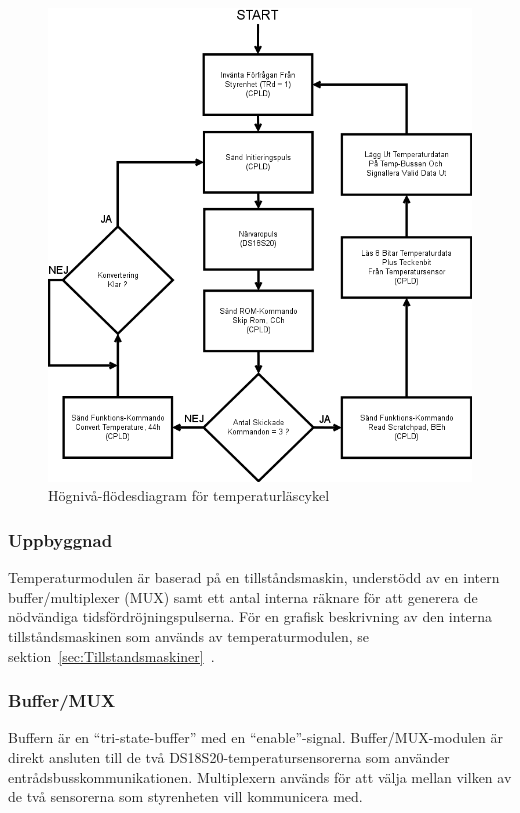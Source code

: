 \documentclass[a4paper,11pt]{article}
\begin{document}
		\begin{figure}[H]
		  \centering
		      \includegraphics[scale=0.5, angle=0]{ReadCycleFlowChart.png}
		  	\caption{Högnivå-flödesdiagram för temperaturläscykel}
			\label{fig:RCFlowChart}
		\end{figure}

	\subsubsection{Uppbyggnad}

	Temperaturmodulen är baserad på en tillståndsmaskin, understödd av en intern buffer/multiplexer (MUX) samt 
	ett antal interna räknare för att generera de nödvändiga tidsfördröjningspulserna. För en grafisk beskrivning av den interna tillståndsmaskinen som används av temperaturmodulen,
	se sektion~\ref{sec:Tillstandsmaskiner}~.

	\subsubsection{Buffer/MUX}

	Buffern är en ``tri-state-buffer'' med en ``enable''-signal.
	Buffer/MUX-modulen är direkt ansluten till de två DS18S20-temperatursensorerna som använder entrådsbusskommunikationen.
	Multiplexern används för att välja mellan vilken av de två sensorerna som styrenheten vill kommunicera med.
\end{document}

